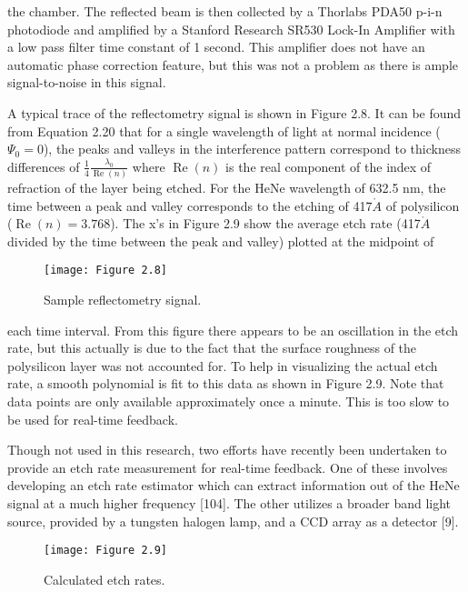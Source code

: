 
\noindent the chamber. The reflected beam is then collected by a Thorlabs PDA50 p-i-n photodiode and amplified by a Stanford Research SR530 Lock-In Amplifier with a low pass filter time constant of 1 second. This amplifier does not have an automatic phase correction feature,
but this was not a problem as there is ample signal-to-noise in this signal.

A typical trace of the reflectometry signal is shown in Figure 2.8. It can be found
from Equation 2.20 that for a single wavelength of light at normal incidence ($\Psi_{0} = 0$), the peaks and valleys in the interference pattern correspond to thickness differences of
$\frac{1}{4}\frac{\lambda_{0}}{\operatorname{Re}(n)}$ where $\operatorname{Re}(n)$ is the real component of the index of refraction of the layer being etched. For the HeNe wavelength of 632.5 nm, the time between a peak and valley corresponds to the etching of 417$\mathring{A}$ of polysilicon ($\operatorname{Re}(n) = 3.768$). The x’s in Figure 2.9 show the average etch rate (417$\mathring{A}$ divided by the time between the peak and valley) plotted at the midpoint of

\begin{figure}[H]
	\centering
	\texttt{[image: Figure 2.8]}
	\bf\caption{ Sample reflectometry signal.}
	\label{fig:2.8}
\end{figure}

\noindent each time interval. From this figure there appears to be an oscillation in the etch rate, but
this actually is due to the fact that the surface roughness of the polysilicon layer was not
accounted for. To help in visualizing the actual etch rate, a smooth polynomial is fit to this
data as shown in Figure 2.9. Note that data points are only available approximately once
a minute. This is too slow to be used for real-time feedback.

Though not used in this research, two efforts have recently been undertaken to provide
an etch rate measurement for real-time feedback. One of these involves developing an etch
rate estimator which can extract information out of the HeNe signal at a much higher
frequency [104]. The other utilizes a broader band light source, provided by a tungsten
halogen lamp, and a CCD array as a detector [9].


\begin{figure}[H]
	\centering
	\texttt{[image: Figure 2.9]}
	\bf\caption{  Calculated etch rates.}
	\label{fig:2.9}
\end{figure}

